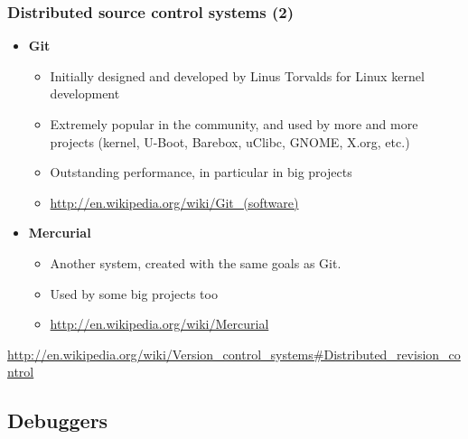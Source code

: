 \begin{frame}
  \frametitle{Distributed source control systems (2)}
  \begin{itemize}
  \item {\bf Git}
    \begin{itemize}
    \item Initially designed and developed by Linus Torvalds for Linux
      kernel development
    \item Extremely popular in the community, and used by more and
      more projects (kernel, U-Boot, Barebox, uClibc, GNOME, X.org,
      etc.)
    \item Outstanding performance, in particular in big projects
    \item \url{http://en.wikipedia.org/wiki/Git_(software)}
    \end{itemize}
  \item {\bf Mercurial}
    \begin{itemize}
    \item Another system, created with the same goals as Git.
    \item Used by some big projects too
    \item \url{http://en.wikipedia.org/wiki/Mercurial}
    \end{itemize}
  \end{itemize}
  \url{http://en.wikipedia.org/wiki/Version_control_systems\#Distributed_revision_control}
\end{frame}

\subsection{Debuggers}


